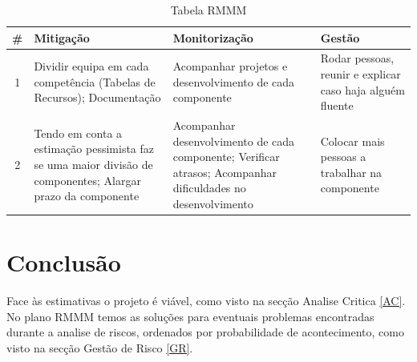 \documentclass[a4paper]{report}
\begin{document}
\begin{table}[h]
\centering
\begin{tabularx}{\textwidth}{c|X|X|X}
\# & Mitigação  & Monitorização & Gestão \\ \hline
1  & Dividir equipa em cada competência (Tabelas de Recursos); Documentação                                     & Acompanhar projetos e desenvolvimento de cada componente                                                     & Rodar pessoas, reunir e explicar caso haja alguém fluente \\ \hline
2  & Tendo em conta a estimação pessimista faz se uma maior divisão de componentes; Alargar prazo da componente & Acompanhar desenvolvimento de cada componente; Verificar atrasos; Acompanhar dificuldades no desenvolvimento & Colocar mais pessoas a trabalhar na componente         
\end{tabularx}
\caption{Tabela RMMM}
\label{TabRIMM}
\end{table}
\chapter{Conclusão}
Face às estimativas o projeto é viável, como visto na secção Analise Critica \ref{AC}. 
No plano RMMM temos as soluções para eventuais problemas encontradas durante a analise de riscos, ordenados por probabilidade de acontecimento, como visto na secção Gestão de Risco \ref{GR}.
\clearpage
{}

\end{document}
